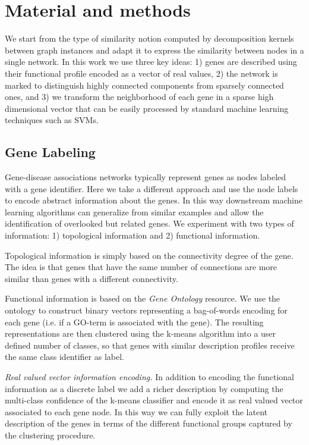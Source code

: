 \documentclass[review]{elsarticle}
\begin{document}
\section{Material and methods}
We start from the type of similarity notion computed by decomposition kernels between graph instances and adapt it to express the similarity between nodes in a single network. In this work we use three key ideas: 1) genes are described using their functional profile encoded as a vector of real values, 2) the network is marked to distinguish highly connected components from sparsely connected ones, and 3) we transform the neighborhood of each gene in a sparse high dimensional vector that can be easily processed by standard machine learning techniques such as SVMs.

\subsection{Gene Labeling} Gene-disease associations networks typically represent genes as nodes labeled with a gene identifier. Here we take a different approach and use the node labels to encode abstract information about the genes. In this way downstream machine learning algorithms can generalize from similar examples and allow the identification of overlooked but related genes. We experiment with two types of information: 1) topological information and 2) functional information. 

Topological information is simply based on the connectivity degree of the gene. The idea is that genes that have the same number of connections are more similar than genes with a different connectivity. 

Functional information is based on the \textit{Gene Ontology} \cite{gene2004gene} resource. We use the ontology to construct binary vectors representing a bag-of-words encoding for each gene (i.e. if a GO-term is associated with the gene). The resulting representations are then clustered using the k-means algorithm  into a user defined number of classes, so that genes with similar description profiles receive the same class identifier as label. 

\textit{Real valued vector information encoding.}
In addition to encoding the functional information as a discrete label we add a richer description by computing the multi-class confidence of the k-means classifier and encode it as real valued vector associated to each gene node. In this way we can fully exploit the latent description of the genes in terms of the different functional groups captured by the clustering procedure.
\end{document}

